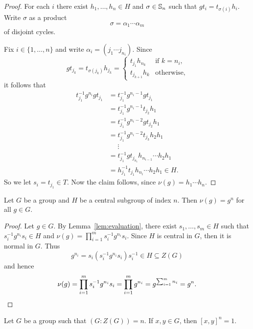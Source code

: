 \begin{proof}
	For each $i$ there exist $h_1,\dots,h_n\in H$ and $\sigma\in\mathbb{S}_n$ such that 
	$gt_i=t_{\sigma(i)}h_i$. Write $\sigma$ as a product 
	\[
		\sigma=\alpha_1\cdots\alpha_m
	\]
	of disjoint cycles. 

	Fix $i\in\{1,\dots,n\}$ and write  
	$\alpha_i=(j_{1}\cdots j_{n_i})$. Since  
	\[
		g t_{j_k}=t_{\sigma(j_k)}h_{j_k}=\begin{cases}
			t_{j_1}h_{n_k} & \text{if $k=n_i$},\\
			t_{j_{k+1}}h_{k} & \text{otherwise},
		\end{cases}
	\]
	it follows that 
	\begin{align*}
	t_{j_1}^{-1}g^{n_i}gt_{j_1}
	&=t_{j_1}^{-1}g^{n_i-1}gt_{j_1}\\
	&=t_{j_1}^{-1}g^{n_i-1}t_{j_2}h_1\\
	&=t_{j_1}^{-1}g^{n_i-2}gt_{j_2}h_1\\
	&=t_{j_1}^{-1}g^{n_i-2}t_{j_3}h_2h_1\\
	&\phantom{=}\vdots\\
	&=t_{j_1}^{-1}gt_{j_{n_i}}h_{n_{i-1}}\cdots h_2h_1\\
	&=h_{j_1}^{-1}t_{j_1}h_{n_i}\cdots h_2h_1\in H. 	
	\end{align*}
	So we let $s_i=t_{j_1}\in T$. Now the claim follows, 
	since $\nu(g)=h_1\cdots h_{n}$.
\end{proof}

\begin{proposition}
	\label{prop:v(g)=g^n}
	Let $G$ be a group and $H$ be a central subgroup of index $n$. Then 
	$\nu(g)=g^n$ for all $g\in G$.
\end{proposition}

\begin{proof}
	Let $g\in G$. By Lemma~\ref{lem:evaluation}, there exist $s_1,\dots,s_m\in
	H$ such that $s_i^{-1}g^{n_i}s_i\in H$ and $\nu(g)=\prod_{i=1}^m
	s_i^{-1}g^{n_i}s_i$.  Since $H$ is central in $G$, then it is normal in $G$. Thus 
	\[
	g^{n_i}=s_i(s_i^{-1}g^{n_i}s_i)s_i^{-1}\in H\subseteq Z(G)
	\]
	and hence  
	\[
		\nu(g)
		=\prod_{i=1}^m s_i^{-1}g^{n_i}s_i
		=\prod_{i=1}^m g^{n_i}
		=g^{\sum_{i=1}^m n_i}
		=g^n.\qedhere
	\]
\end{proof}
%

\begin{exercise}
	\label{xca:[x,y]^n=1}
	Let $G$ be a group such that $(G:Z(G))=n$. If $x,y\in G$, then $[x,y]^n=1$. 
\end{exercise}

